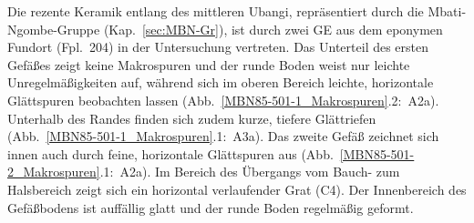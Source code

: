 \begin{multicols}{2}
Die rezente Keramik entlang des mittleren \mbox{Ubangi}, repräsentiert durch die Mbati-Ngombe-Gruppe (Kap.~\ref{sec:MBN-Gr}), ist durch zwei GE aus dem eponymen Fundort (Fpl.~204) in der Untersuchung vertreten. Das Unterteil des ersten Gefäßes zeigt keine Makrospuren und der runde Boden weist nur leichte Unregelmäßigkeiten auf, während sich im oberen Bereich leichte, horizontale Glättspuren beobachten lassen (Abb.~\ref{MBN85-501-1_Makrospuren}.2:~A2a). Unterhalb des Randes finden sich zudem kurze, tiefere Glättriefen (Abb.~\ref{MBN85-501-1_Makrospuren}.1:~A3a). Das zweite Gefäß zeichnet sich innen auch durch feine, horizontale Glättspuren aus (Abb.~\ref{MBN85-501-2_Makrospuren}.1:~A2a). Im Bereich des Übergangs vom Bauch- zum Halsbereich zeigt sich ein horizontal verlaufender Grat (C4). Der Innenbereich des Gefäßbodens ist auffällig glatt und der runde Boden regelmäßig geformt.\columnbreak


\end{multicols}
